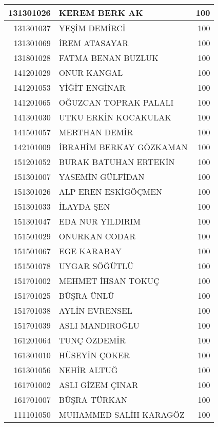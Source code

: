 \documentclass[12pt]{article}
\begin{document}
\begin{longtable}{||r||l||r||}
    \midrule
    131301026 & KEREM BERK AK & 100 \\
    \midrule
    131301037 & YEŞİM DEMİRCİ & 100 \\
    \midrule
    131301069 & İREM ATASAYAR & 100 \\
    \midrule
    131801028 & FATMA BENAN BUZLUK & 100 \\
    \midrule
    141201029 & ONUR KANGAL & 100 \\
    \midrule
    141201053 & YİĞİT ENGİNAR & 100 \\
    \midrule
    141201065 & OĞUZCAN TOPRAK PALALI & 100 \\
    \midrule
    141301030 & UTKU ERKİN KOCAKULAK & 100 \\
    \midrule
    141501057 & MERTHAN DEMİR & 100 \\
    \midrule
    142101009 & İBRAHİM BERKAY GÖZKAMAN & 100 \\
    \midrule
    151201052 & BURAK BATUHAN ERTEKİN & 100 \\
    \midrule
    151301007 & YASEMİN GÜLFİDAN & 100 \\
    \midrule
    151301026 & ALP EREN ESKİGÖÇMEN & 100 \\
    \midrule
    151301033 & İLAYDA ŞEN & 100 \\
    \midrule
    151301047 & EDA NUR YILDIRIM & 100 \\
    \midrule
    151501029 & ONURKAN CODAR & 100 \\
    \midrule
    151501067 & EGE KARABAY & 100 \\
    \midrule
    151501078 & UYGAR SÖĞÜTLÜ & 100 \\
    \midrule
    151701002 & MEHMET İHSAN TOKUÇ & 100 \\
    \midrule
    151701025 & BÜŞRA ÜNLÜ & 100 \\
    \midrule
    151701038 & AYLİN EVRENSEL & 100 \\
    \midrule
    151701039 & ASLI MANDIROĞLU & 100 \\
    \midrule
    161201064 & TUNÇ ÖZDEMİR & 100 \\
    \midrule
    161301010 & HÜSEYİN ÇOKER & 100 \\
    \midrule
    161301056 & NEHİR ALTUĞ & 100 \\
    \midrule
    161701002 & ASLI GİZEM ÇINAR & 100 \\
    \midrule
    161701007 & BÜŞRA TÜRKAN & 100 \\
    \midrule
    111101050 & MUHAMMED SALİH KARAGÖZ & 100 \\

\end{longtable}
\end{document}
